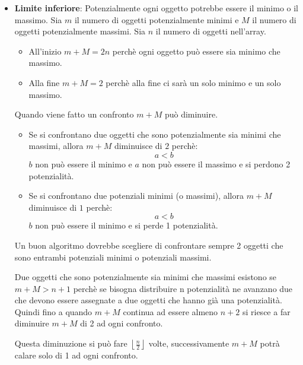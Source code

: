 \documentclass[a4paper]{article}
\begin{document}
\begin{itemize}
  \item \textbf{Limite inferiore}: Potenzialmente ogni oggetto potrebbe essere il minimo
    o il massimo. Sia \( m \) il numero di oggetti potenzialmente minimi e \( M \) il
    numero di oggetti potenzialmente massimi. Sia \( n \) il numero di oggetti nell'array.
    \begin{itemize}
      \item All'inizio \( m+M = 2n \) perchè ogni oggetto può essere sia minimo che
        massimo.
      \item Alla fine \( m+M = 2 \) perchè alla fine ci sarà un solo minimo e un solo
        massimo.
    \end{itemize}
    Quando viene fatto un confronto \( m+M \) può diminuire.
    \begin{itemize}
      \item Se si confrontano due oggetti che sono potenzialmente sia minimi che massimi,
        allora \( m+M \) diminuisce di \( 2 \) perchè:
        \[
          a < b
        \]
        \( b \) non può essere il minimo e \( a \) non può essere il massimo e si perdono
        2 potenzialità.

      \item Se si confrontano due potenziali minimi (o massimi), allora \( m+M \)
        diminuisce di \( 1 \) perchè:
        \[
          a < b
        \]
        \( b \) non può essere il minimo e si perde 1 potenzialità.
    \end{itemize}
    Un buon algoritmo dovrebbe scegliere di confrontare sempre 2 oggetti che sono
    entrambi potenziali minimi o potenziali massimi.

    \vspace{1em}
    \noindent
    Due oggetti che sono potenzialmente sia minimi che massimi esistono
    se \( m+M > n+1 \) perchè se bisogna distribuire n potenzialità ne avanzano
    due che devono essere assegnate a due oggetti che hanno già una potenzialità.
    Quindi fino a quando \( m+M \) continua ad essere almeno \( n+2 \) si riesce a
    far diminuire \( m+M \) di 2 ad ogni confronto.

    Questa diminuzione si può fare \( \left\lfloor \frac{n}{2} \right\rfloor \) volte,
    successivamente \( m+M \) potrà calare solo di 1 ad ogni confronto.


\end{itemize}
\end{document}
